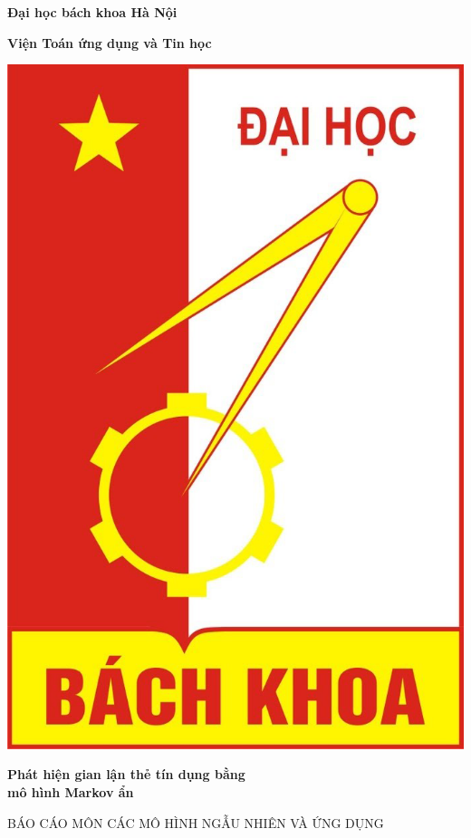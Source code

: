 
\begin{titlepage}
\centerline{\bf Đại học bách khoa Hà Nội}
\centerline{\bf Viện Toán ứng dụng và Tin học}
\vspace*{1.5cm}

\begin{center}

\includegraphics[scale=0.3]{logo.png}
\end{center}
\vspace*{0.75cm}

\begin{center}
	\Large \bf Phát hiện gian lận thẻ tín dụng bằng \\ mô hình Markov ẩn
\end{center}

\vspace*{2cm}
\centerline{BÁO CÁO MÔN CÁC MÔ HÌNH NGẪU NHIÊN VÀ ỨNG DỤNG}


\end{titlepage}
